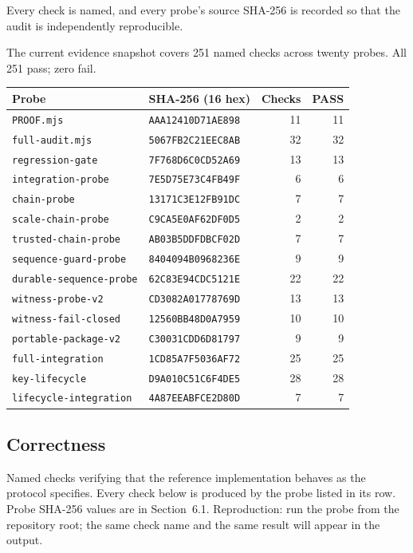 \documentclass[11pt,a4paper]{article}
\begin{document}
Every check is named, and every probe's source SHA-256 is recorded so that the audit is independently reproducible.

The current evidence snapshot covers 251 named checks across twenty probes. All 251 pass; zero fail.

\begin{table}[h]
\centering
\small
\begin{tabular}{@{}llrr@{}}
\toprule
Probe & SHA-256 (16 hex) & Checks & PASS \\
\midrule
\texttt{PROOF.mjs} & \texttt{AAA12410D71AE898} & 11 & 11 \\
\texttt{full-audit.mjs} & \texttt{5067FB2C21EEC8AB} & 32 & 32 \\
\texttt{regression-gate} & \texttt{7F768D6C0CD52A69} & 13 & 13 \\
\texttt{integration-probe} & \texttt{7E5D75E73C4FB49F} & 6 & 6 \\
\texttt{chain-probe} & \texttt{13171C3E12FB91DC} & 7 & 7 \\
\texttt{scale-chain-probe} & \texttt{C9CA5E0AF62DF0D5} & 2 & 2 \\
\texttt{trusted-chain-probe} & \texttt{AB03B5DDFDBCF02D} & 7 & 7 \\
\texttt{sequence-guard-probe} & \texttt{8404094B0968236E} & 9 & 9 \\
\texttt{durable-sequence-probe} & \texttt{62C83E94CDC5121E} & 22 & 22 \\
\texttt{witness-probe-v2} & \texttt{CD3082A01778769D} & 13 & 13 \\
\texttt{witness-fail-closed} & \texttt{12560BB48D0A7959} & 10 & 10 \\
\texttt{portable-package-v2} & \texttt{C30031CDD6D81797} & 9 & 9 \\
\texttt{full-integration} & \texttt{1CD85A7F5036AF72} & 25 & 25 \\
\texttt{key-lifecycle} & \texttt{D9A010C51C6F4DE5} & 28 & 28 \\
\texttt{lifecycle-integration} & \texttt{4A87EEABFCE2D80D} & 7 & 7 \\
\bottomrule
\end{tabular}
\end{table}

\subsection{Correctness}

Named checks verifying that the reference implementation behaves as the protocol specifies. Every check below is produced by the probe listed in its row. Probe SHA-256 values are in Section~6.1. Reproduction: run the probe from the repository root; the same check name and the same result will appear in the output.
\end{document}
